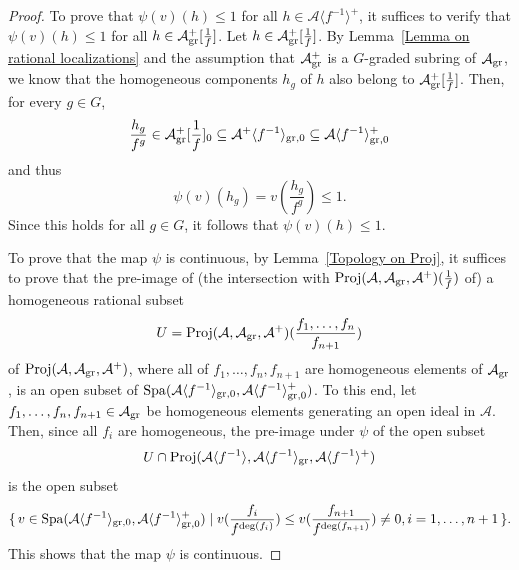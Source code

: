 \documentclass[12pt,twoside,a4paper]{article}
\theoremstyle{definition}
\theoremstyle{remark}
\newcommand\gr{{\rm gr}}
\newcommand\Proj{{\rm Proj}}
\newcommand\Spa{{\rm Spa}}
\begin{document}
\begin{proof}
To prove that $\psi(v)(h)\leq1$ for all $h\in \mathcal{A}\langle f^{-1}\rangle^{+}$, it suffices to verify that $\psi(v)(h)\leq 1$ for all $h\in \mathcal{A}_{\gr}^{+}[\frac{1}{f}]$. Let $h\in \mathcal{A}_{\gr}^{+}[\frac{1}{f}]$. By Lemma~\ref{Lemma on rational localizations} and the assumption that $\mathcal{A}_{\gr}^{+}$ is a $G$-graded subring of $\mathcal{A}_{\gr}$, we know that the homogeneous components $h_{g}$ of $h$ also belong to $\mathcal{A}_{\gr}^{+}[\frac{1}{f}]$. Then, for every $g\in G$, \begin{equation*}\frac{h_{g}}{f^{g}}\in \mathcal{A}_{\gr}^{+}[\frac{1}{f}]_{0}\subseteq \mathcal{A}^{+}\langle f^{-1}\rangle_{\gr, 0}\subseteq \mathcal{A}\langle f^{-1}\rangle_{\gr, 0}^{+}\end{equation*}and thus \begin{equation*}\psi(v)(h_{g})=v(\frac{h_{g}}{f^{g}})\leq 1.\end{equation*}Since this holds for all $g\in G$, it follows that $\psi(v)(h)\leq1$. 

To prove that the map $\psi$ is continuous, by Lemma~\ref{Topology on Proj}, it suffices to prove that the pre-image of (the intersection with $\Proj(\mathcal{A}, \mathcal{A}_{\gr}, \mathcal{A}^{+})(\frac{1}{f})$ of) a homogeneous rational subset \begin{equation*}U=\Proj(\mathcal{A}, \mathcal{A}_{\gr}, \mathcal{A}^{+})(\frac{f_1,\dots, f_n}{f_{n+1}})\end{equation*}of $\Proj(\mathcal{A}, \mathcal{A}_{\gr}, \mathcal{A}^{+})$, where all of $f_1, \dots, f_{n}, f_{n+1}$ are homogeneous elements of $\mathcal{A}_{\gr}$, is an open subset of $\Spa(\mathcal{A}\langle f^{-1}\rangle_{\gr,0}, \mathcal{A}\langle f^{-1}\rangle_{\gr,0}^{+})$. To this end, let $f_1,\dots, f_n, f_{n+1}\in \mathcal{A}_{\gr}$ be homogeneous elements generating an open ideal in $\mathcal{A}$. Then, since all $f_{i}$ are homogeneous, the pre-image under $\psi$ of the open subset \begin{equation*}U\cap \Proj(\mathcal{A}\langle f^{-1}\rangle, \mathcal{A}\langle f^{-1}\rangle_{\gr}, \mathcal{A}\langle f^{-1}\rangle^{+})\end{equation*}is the open subset \begin{equation*}\{\, v\in \Spa(\mathcal{A}\langle f^{-1}\rangle_{\gr,0}, \mathcal{A}\langle f^{-1}\rangle_{\gr,0}^{+})\mid v(\frac{f_{i}}{f^{\deg(f_{i})}})\leq v(\frac{f_{n+1}}{f^{\deg(f_{n+1})}})\neq0, i=1,\dots, n+1\,\}.\end{equation*}This shows that the map $\psi$ is continuous.  


\end{proof}
\end{document}
